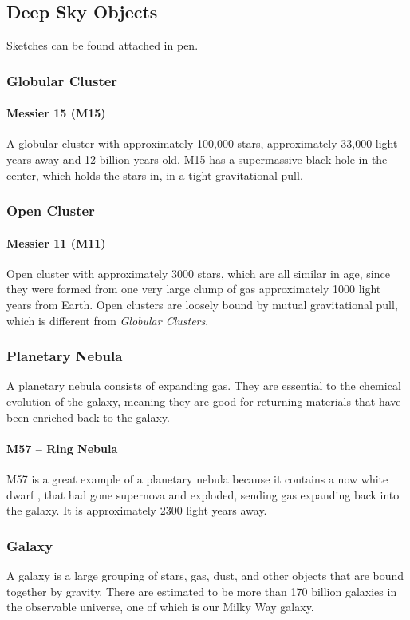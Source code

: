 \documentclass{article}
\begin{document}
\subsection{Deep Sky Objects}
Sketches can be found attached in pen.
\subsubsection{Globular Cluster}
\paragraph{Messier 15 (M15)}
A globular cluster with approximately 100,000 stars, approximately 33,000 light-years away and 12 billion years old.  M15 has a supermassive black hole in the center, which holds the stars in, in a tight gravitational pull.
\subsubsection{Open Cluster}
\paragraph{Messier 11 (M11)}
Open cluster with approximately 3000 stars, which are all similar in age, since they were formed from one very large clump of gas approximately 1000 light years from Earth.  Open clusters are loosely bound by mutual gravitational pull, which is different from \emph{Globular Clusters}.
\subsubsection{Planetary Nebula}
A planetary nebula consists of expanding gas.  They are essential to the chemical evolution of the galaxy, meaning they are good for returning materials that have been enriched back to the galaxy.
\paragraph{M57 -- Ring Nebula}
M57 is a great example of a planetary nebula because it contains a now white dwarf , that had gone supernova and exploded, sending gas expanding back into the galaxy.  It is approximately 2300 light years away.\cite{ringnebula}    
\subsubsection{Galaxy}
A galaxy is a large grouping of stars, gas, dust, and other objects that are bound together by gravity.  There are estimated to be more than 170 billion galaxies in the observable universe, one of which is our Milky Way galaxy.
\end{document}
